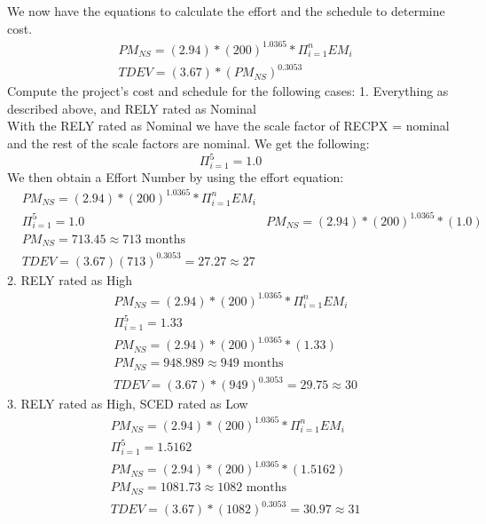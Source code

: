 \documentclass[12pt,letterpaper]{article}
\begin{document}
We now have the equations to calculate the effort and the schedule to determine cost.
    \begin{align*}
        &PM_{NS} = (2.94)*(200)^{1.0365} * \Pi_{i=1}^{n}EM_i\\
        &TDEV = (3.67)*(PM_{NS})^{0.3053}
    \end{align*}
Compute the project’s cost and schedule for the following cases:
1.	Everything as described above, and RELY rated as Nominal\\
With the RELY rated as Nominal we have the scale factor of RECPX = nominal and the rest of the scale factors are nominal. We get the following:
    \begin{equation*}
        \Pi_{i=1}^{5} = 1.0
    \end{equation*}
We then obtain a Effort Number by using the effort equation:
    \begin{align*}
        &PM_{NS} = (2.94)*(200)^{1.0365} * \Pi_{i=1}^{n}EM_i\\
        &\Pi_{i=1}^{5} = 1.0
        &PM_{NS} = (2.94)*(200)^{1.0365} * (1.0) \\
        &PM_{NS} = 713.45 \approx 713 \text{ months}\\
        &TDEV = (3.67)(713)^{0.3053} = 27.27 \approx 27 
    \end{align*}
2.	RELY rated as High\\
    \begin{align*}
        &PM_{NS} = (2.94)*(200)^{1.0365} * \Pi_{i=1}^{n}EM_i\\
        &\Pi_{i=1}^{5} = 1.33\\
        &PM_{NS} = (2.94)*(200)^{1.0365} * (1.33) \\
        &PM_{NS} =  948.989\approx 949  \text{ months}\\
        &TDEV = (3.67)*(949)^{0.3053} =  29.75\approx 30
    \end{align*}
3.	RELY rated as High, SCED rated as Low
    \begin{align*}
        &PM_{NS} = (2.94)*(200)^{1.0365} * \Pi_{i=1}^{n}EM_i\\
        &\Pi_{i=1}^{5} = 1.5162\\
        &PM_{NS} = (2.94)*(200)^{1.0365} * (1.5162) \\
        &PM_{NS} =  1081.73\approx  1082\text{ months}\\
        &TDEV = (3.67)*(1082)^{0.3053} =  30.97\approx 31  
    \end{align*}
\end{document}

